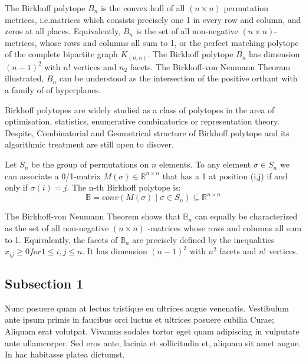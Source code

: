 The Birkhoff polytope $B_n$ is the convex hull of all $(n\times n)$ permutation metrices, i.e.matrices which consists precisely one 1 in every row and column, and zeros at all places. Equivalently, $B_n$ is the set of all non-negative $(n \times n)$-metrices, whose rows and columns all sum to 1, or the perfect matching polytope of the complete bipartite graph $K_(n,n)$. The Birkhoff polytope $B_n$ has dimension $(n-1)^2$ with $n!$ vertices and $n_2$ facets. The Birkhoff-von Neumann Theoram illustrated, $B_n$ can be understood as the intersection of the positive orthant with a family of of hyperplanes.

Birkhoff polytopes are widely studied as a class of polytopes in the area of optimisation, statistics, enumerative combinatorics or representation theory. Despite, Combinatorial and Geometrical structure of Birkhoff polytope and its algorithmic treatment are still open to disover.

 Let $S_n$ be the group of permutations on $n$ elements. To any element $\sigma \in S_n$ we can associate a 0/1-matrix $M( \sigma ) \in \mathbb{R}^{n \times n}$ that has a 1 at position (i,j) if and only if $\sigma(i)=j$. The n-th Birkhoff polytope is:
\begin{equation}
\mathbb{B} = conv(M( \sigma ) \mid \sigma \in S_n ) \subseteq \mathbb{R}^{n \times n}
\label{eqn:Einstein}
\end{equation}	

The Birkhoff-von Neumann Theorem shows that $\mathbb{B}_n$ can equally be characterized as the set of all non-negative $(n \times n)$ -matrices whose rows and columns all sum to 1. Equivalently, the facets of $\mathbb{B}_n$ are precisely defined by the inequalities $x_{ij} \geq 0 for 1 \leq i, j \leq n$. It has dimension $(n-1)^2$ with $n^2$ facets and $n!$ vertices.



\subsection{Subsection 1}

Nunc posuere quam at lectus tristique eu ultrices augue venenatis. Vestibulum ante ipsum primis in faucibus orci luctus et ultrices posuere cubilia Curae; Aliquam erat volutpat. Vivamus sodales tortor eget quam adipiscing in vulputate ante ullamcorper. Sed eros ante, lacinia et sollicitudin et, aliquam sit amet augue. In hac habitasse platea dictumst.



